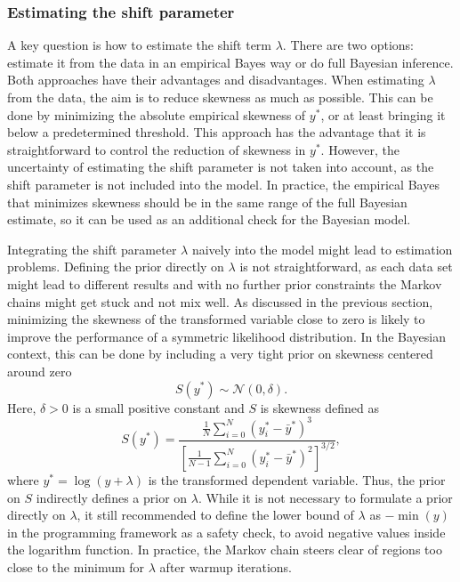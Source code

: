 \subsubsection{Estimating the shift parameter}
A key question is how to estimate the shift term $\lambda$.
There are two options: estimate it from the data in an empirical Bayes way or do full Bayesian inference.
Both approaches have their advantages and disadvantages.
When estimating $\lambda$ from the data, the aim is to reduce skewness as much as possible.
This can be done by minimizing the absolute empirical skewness of $y^*$, or at least bringing it below a predetermined threshold.
This approach has the advantage that it is straightforward to control the reduction of skewness in $y^*$.
However, the uncertainty of estimating the shift parameter is not taken into account, as the shift parameter is not included into the model.
In practice, the empirical Bayes that minimizes skewness should be in the same range of the full Bayesian estimate, so it can be used as an additional check for the Bayesian model.

Integrating the shift parameter $\lambda$ naively into the model might lead to estimation problems.
Defining the prior directly on $\lambda$ is not straightforward, as each data set might lead to different results and with no further prior constraints the Markov chains might get stuck and not mix well.
As discussed in the previous section, minimizing the skewness of the transformed variable close to zero is likely to improve the performance of a symmetric likelihood distribution.
In the Bayesian context, this can be done by including a very tight prior on skewness centered around zero
\begin{equation*}
    S(y^*) \sim \mathcal N(0, \delta).
\end{equation*}
Here, $\delta > 0$ is a small positive constant and $S$ is skewness defined as
\begin{equation*}
    \displaystyle S(y^*) =  \frac{\frac 1 N \sum^{N}_{i = 0} (y_i^* - \bar y^* )^3}
    {\left[ \frac{1}{N - 1} \sum^{N}_{i = 0} (y_i^* - \bar y^* )^2 \right]^{3/2}},
\end{equation*}
where $y^* = \log(y + \lambda)$ is the transformed dependent variable. Thus, the prior on $S$ indirectly defines a prior on $\lambda$.
While it is not necessary to formulate a prior directly on $\lambda$, it still recommended to define the lower bound of $\lambda$ as $-\min(y)$ in the programming framework as a safety check, to avoid negative values inside the logarithm function.
In practice, the Markov chain steers clear of regions too close to the minimum for $\lambda$ after warmup iterations.



